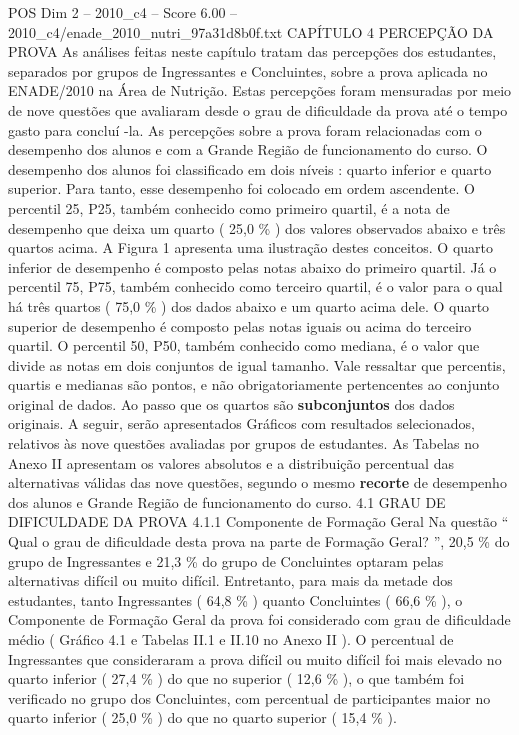 \begin{textsample}{POS Dim 2 – 2010\_c4 – Score 6.00 – 2010\_c4/enade\_2010\_nutri\_97a31d8b0f.txt}  \label{ex:f2_pos_149}
CAPÍTULO 4 PERCEPÇÃO DA PROVA As análises feitas neste capítulo tratam das percepções dos estudantes, separados por grupos de Ingressantes e Concluintes, sobre a prova aplicada no ENADE/2010 na Área de Nutrição.
Estas percepções foram mensuradas por meio de nove questões que avaliaram desde o grau de dificuldade da prova até o tempo gasto para concluí -la.
As percepções sobre a prova foram relacionadas com o desempenho dos alunos e com a Grande Região de funcionamento do curso.
O desempenho dos alunos foi classificado em dois níveis : quarto inferior e quarto superior.
Para tanto, esse desempenho foi colocado em ordem ascendente.
O percentil 25, P25, também conhecido como primeiro quartil, é a nota de desempenho que deixa um quarto ( 25,0 \% ) dos valores observados abaixo e três quartos acima.
A Figura 1 apresenta uma ilustração destes conceitos.
O quarto inferior de desempenho é composto pelas notas abaixo do primeiro quartil.
Já o percentil 75, P75, também conhecido como terceiro quartil, é o valor para o qual há três quartos ( 75,0 \% ) dos dados abaixo e um quarto acima dele.
O quarto superior de desempenho é composto pelas notas iguais ou acima do terceiro quartil.
O percentil 50, P50, também conhecido como mediana, é o valor que divide as notas em dois conjuntos de igual tamanho.
Vale ressaltar que percentis, quartis e medianas são pontos, e não obrigatoriamente pertencentes ao conjunto original de dados.
Ao passo que os quartos são \textbf{subconjuntos} dos dados originais.
A seguir, serão apresentados Gráficos com resultados selecionados, relativos às nove questões avaliadas por grupos de estudantes.
As Tabelas no Anexo II apresentam os valores absolutos e a distribuição percentual das alternativas válidas das nove questões, segundo o mesmo \textbf{recorte} de desempenho dos alunos e Grande Região de funcionamento do curso. 4.1 GRAU DE DIFICULDADE DA PROVA 4.1.1 Componente de Formação Geral Na questão “ Qual o grau de dificuldade desta prova na parte de Formação Geral? ”, 20,5 \% do grupo de Ingressantes e 21,3 \% do grupo de Concluintes optaram pelas alternativas difícil ou muito difícil.
Entretanto, para mais da metade dos estudantes, tanto Ingressantes ( 64,8 \% ) quanto Concluintes ( 66,6 \% ), o Componente de Formação Geral da prova foi considerado com grau de dificuldade médio ( Gráfico 4.1 e Tabelas II.1 e II.10 no Anexo II ).
O percentual de Ingressantes que consideraram a prova difícil ou muito difícil foi mais elevado no quarto inferior ( 27,4 \% ) do que no superior ( 12,6 \% ), o que também foi verificado no grupo dos Concluintes, com percentual de participantes maior no quarto inferior ( 25,0 \% ) do que no quarto superior ( 15,4 \% ).

\end{textsample}
